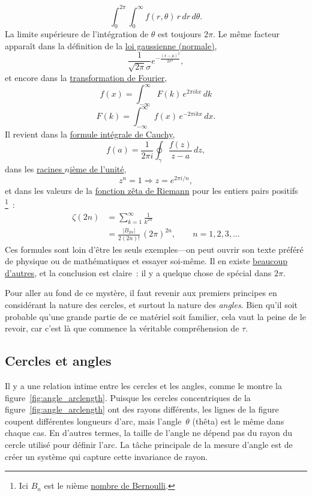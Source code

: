 \[
  \int_0^{2\pi}\int_0^\infty f(r, \theta)\, r\, dr\, d\theta.
\]
La limite supérieure de l'intégration de $\theta$ est toujours $2\pi$. Le même facteur apparaît dans la définition de la \href{https://fr.wikipedia.org/wiki/Loi_normale}{loi gaussienne (normale)},
\[
  \frac{1}{\sqrt{2\pi}\sigma}e^{-\frac{(x-\mu)^2}{2\sigma^2}},
\]
et encore dans la \href{https://fr.wikipedia.org/wiki/Transformation_de_Fourier}{transformation de Fourier},
\[
  f(x) = \int_{-\infty}^\infty F(k)\, e^{2\pi ikx}\,dk
\]
\[
    F(k) = \int_{-\infty}^\infty f(x)\, e^{-2\pi ikx}\,dx.
\]
Il revient dans la \href{https://fr.wikipedia.org/wiki/Formule_intégrale_de_Cauchy}{formule intégrale de Cauchy},
\[
  f(a) = \frac{1}{2\pi i}\oint_\gamma\frac{f(z)}{z-a}\,dz,
\]
dans les \href{https://fr.wikipedia.org/wiki/Racine_de_l%27unité}{racines $n$ième de l'unité},
\[
  z^n = 1 \Rightarrow z = e^{2\pi i/n},
\]
et dans les valeurs de la \href{https://fr.wikipedia.org/wiki/Fonction_zêta_de_Riemann}{fonction zêta de Riemann} pour les entiers pairs positifs\,\footnote{Ici $B_n$ est le $n$ième \href{https://fr.wikipedia.org/wiki/Nombre_de_Bernoulli}{nombre de Bernoulli}.}~:
\[
\begin{split}
  \zeta(2n) & = \sum_{k=1}^\infty \frac{1}{k^{2n}} \\
            & = \frac{|B_{2n}|}{2(2n)!}\,(2\pi)^{2n},\qquad n = 1, 2, 3, \ldots
\end{split}
\]
Ces formules sont loin d'être les seuls exemples---on peut ouvrir son texte préféré de physique ou de mathématiques et essayer soi-même. Il en existe \href{http://www.harremoes.dk/Peter/Undervis/Turnpage/Turnpage1.html}{beaucoup d'autres}, et la conclusion est claire~: il y a quelque chose de spécial dans $2\pi$.

Pour aller au fond de ce mystère, il faut revenir aux premiers principes en considérant la nature des cercles, et surtout la nature des \emph{angles}. Bien qu'il soit probable qu'une grande partie de ce matériel soit familier, cela vaut la peine de le revoir, car c'est là que commence la véritable compréhension de $\tau$.

  \subsection{Cercles et angles} %
  \label{sec:circles_and_angles}

Il y a une relation intime entre les cercles et les angles, comme le montre la figure~\ref{fig:angle_arclength}. Puisque les cercles concentriques de la figure~\ref{fig:angle_arclength} ont des rayons différents, les lignes de la figure coupent différentes longueurs d'arc, mais l'angle~$\theta$ (thêta) est le même dans chaque cas. En d'autres termes, la taille de l'angle ne dépend pas du rayon du cercle utilisé pour définir l'arc. La tâche principale de la mesure d'angle est de créer un système qui capture cette invariance de rayon.

